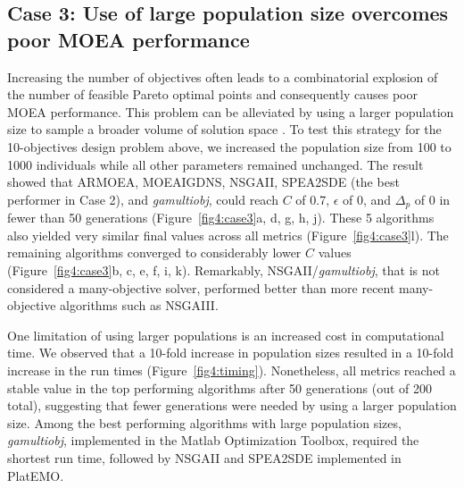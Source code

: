 {\subsection{Case 3: Use of large population size overcomes poor MOEA performance}
Increasing the number of objectives often leads to a combinatorial explosion of the number of feasible Pareto optimal points and consequently causes poor MOEA performance. This problem can be alleviated by using a larger population size to sample a broader volume of solution space \cite{ishibuchi2009}.
To test this strategy for the 10-objectives design problem above, we increased the population size from 100 to 1000 individuals while all other parameters remained unchanged.
The result showed that
ARMOEA,
MOEAIGDNS,
NSGAII,
SPEA2SDE (the best performer in Case 2),
and \textit{gamultiobj},
could reach $C$ of 0.7, $\epsilon$ of 0, and $\Delta_p$ of 0 in fewer than 50 generations (Figure~\ref{fig4:case3}a, d, g, h, j).
These 5 algorithms also yielded very similar final values across all metrics  (Figure~\ref{fig4:case3}l). The remaining algorithms converged to considerably lower $C$ values (Figure~\ref{fig4:case3}b, c, e, f, i, k).
Remarkably, NSGAII/\textit{gamultiobj}, that is not considered a many-objective solver, performed better than more recent many-objective algorithms such as NSGAIII.

One limitation of using larger populations is an increased cost in computational time. We observed that a 10-fold increase in population sizes resulted in a 10-fold increase in the run times (Figure~\ref{fig4:timing}). Nonetheless, all metrics reached a stable value in the top performing algorithms after 50 generations (out of 200 total), suggesting that fewer generations were needed by using a larger population size.  Among the best performing algorithms with large population sizes, \textit{gamultiobj}, implemented in the Matlab Optimization Toolbox, required the shortest run time, followed by NSGAII and SPEA2SDE implemented in PlatEMO.

}
